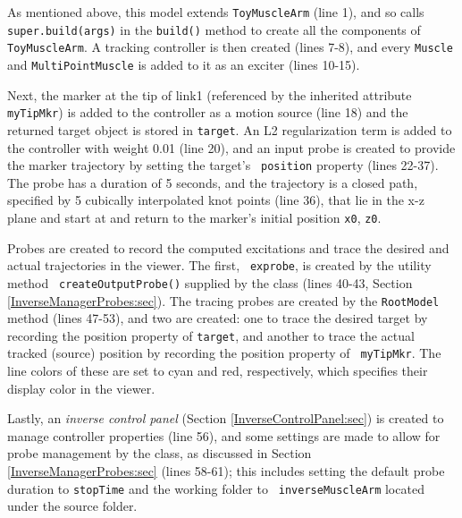 As mentioned above, this model extends {\tt ToyMuscleArm} (line 1), and so
calls {\tt super.build(args)} in the {\tt build()} method to create all the
components of {\tt ToyMuscleArm}. A tracking controller is then created (lines
7-8), and every {\tt Muscle} and {\tt MultiPointMuscle} is added to it as an
exciter (lines 10-15).

Next, the marker at the tip of link1 (referenced by the inherited attribute
{\tt myTipMkr}) is added to the controller as a motion source (line 18) and
the returned target object is stored in {\tt target}.  An L2 regularization
term is added to the controller with weight 0.01 (line 20), and an input probe
is created to provide the marker trajectory by setting the target's {\tt
position} property (lines 22-37). The probe has a duration of 5 seconds, and
the trajectory is a closed path, specified by 5 cubically interpolated knot
points (line 36), that lie in the x-z plane and start at and return to the
marker's initial position {\tt x0}, {\tt z0}.

Probes are created to record the computed excitations and trace the
desired and actual trajectories in the viewer. The first, {\tt
exprobe}, is created by the utility method {\tt
createOutputProbe()} supplied by the
 class 
(lines 40-43, Section \ref{InverseManagerProbes:sec}). The tracing probes
are created by the {\tt RootModel} method
 (lines
47-53), and two are created: one to trace the desired target by recording the
{\sf position} property of {\tt target}, and another to trace the actual
tracked (source) position by recording the {\sf position} property of {\tt
myTipMkr}. The line colors of these are set to cyan and red, respectively,
which specifies their display color in the viewer.

Lastly, an {\it inverse control panel} (Section \ref{InverseControlPanel:sec})
is created to manage controller properties (line 56), and some settings are
made to allow for probe management by the 
 class, as discussed
in Section \ref{InverseManagerProbes:sec} (lines 58-61); this includes setting
the default probe duration to {\tt stopTime} and the working folder to {\tt
inverseMuscleArm} located under the source folder.

